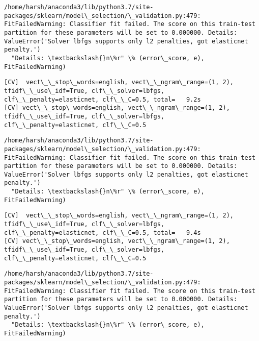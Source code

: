 \documentclass[11pt]{article}
\begin{document}
    \begin{Verbatim}[commandchars=\\\{\}]
/home/harsh/anaconda3/lib/python3.7/site-packages/sklearn/model\_selection/\_validation.py:479: FitFailedWarning: Classifier fit failed. The score on this train-test partition for these parameters will be set to 0.000000. Details: 
ValueError('Solver lbfgs supports only l2 penalties, got elasticnet penalty.')
  "Details: \textbackslash{}n\%r" \% (error\_score, e), FitFailedWarning)

    \end{Verbatim}

    \begin{Verbatim}[commandchars=\\\{\}]
[CV]  vect\_\_stop\_words=english, vect\_\_ngram\_range=(1, 2), tfidf\_\_use\_idf=True, clf\_\_solver=lbfgs, clf\_\_penalty=elasticnet, clf\_\_C=0.5, total=   9.2s
[CV] vect\_\_stop\_words=english, vect\_\_ngram\_range=(1, 2), tfidf\_\_use\_idf=True, clf\_\_solver=lbfgs, clf\_\_penalty=elasticnet, clf\_\_C=0.5 

    \end{Verbatim}

    \begin{Verbatim}[commandchars=\\\{\}]
/home/harsh/anaconda3/lib/python3.7/site-packages/sklearn/model\_selection/\_validation.py:479: FitFailedWarning: Classifier fit failed. The score on this train-test partition for these parameters will be set to 0.000000. Details: 
ValueError('Solver lbfgs supports only l2 penalties, got elasticnet penalty.')
  "Details: \textbackslash{}n\%r" \% (error\_score, e), FitFailedWarning)

    \end{Verbatim}

    \begin{Verbatim}[commandchars=\\\{\}]
[CV]  vect\_\_stop\_words=english, vect\_\_ngram\_range=(1, 2), tfidf\_\_use\_idf=True, clf\_\_solver=lbfgs, clf\_\_penalty=elasticnet, clf\_\_C=0.5, total=   9.4s
[CV] vect\_\_stop\_words=english, vect\_\_ngram\_range=(1, 2), tfidf\_\_use\_idf=True, clf\_\_solver=lbfgs, clf\_\_penalty=elasticnet, clf\_\_C=0.5 

    \end{Verbatim}

    \begin{Verbatim}[commandchars=\\\{\}]
/home/harsh/anaconda3/lib/python3.7/site-packages/sklearn/model\_selection/\_validation.py:479: FitFailedWarning: Classifier fit failed. The score on this train-test partition for these parameters will be set to 0.000000. Details: 
ValueError('Solver lbfgs supports only l2 penalties, got elasticnet penalty.')
  "Details: \textbackslash{}n\%r" \% (error\_score, e), FitFailedWarning)

    \end{Verbatim}
\end{document}
